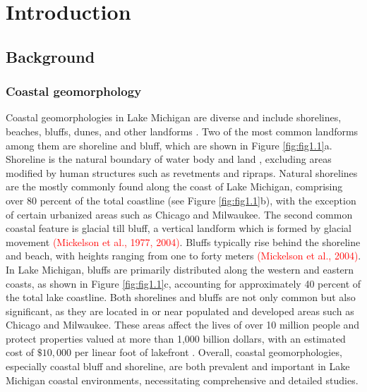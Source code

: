 \chapter{Introduction}
\label{ch:Introduction}

\section{Background}
\label{sec:Background}

\subsection{Coastal geomorphology}
\label{subsec:Coastal geomorphology}

Coastal geomorphologies in Lake Michigan are diverse and include shorelines, beaches, bluffs, dunes, and other landforms \citep{jackson_coastal_2013}. Two of the most common landforms among them are shoreline and bluff, which are shown in Figure \ref{fig:fig1.1}a. Shoreline is the natural boundary of water body and land \citep{del_rio_error_2013}, excluding areas modified by human structures such as revetments and ripraps. Natural shorelines are the mostly commonly found along the coast of Lake Michigan, comprising over 80 percent of the total coastline (see Figure \ref{fig:fig1.1}b), with the exception of certain urbanized areas such as Chicago and Milwaukee. The second common coastal feature is glacial till bluff, a vertical landform which is formed by glacial movement \textcolor{red}{(Mickelson et al., 1977, 2004)}. Bluffs typically rise behind the shoreline and beach, with heights ranging from one to forty meters \textcolor{red}{(Mickelson et al., 2004)}. In Lake Michigan, bluffs are primarily distributed along the western and eastern coasts, as shown in Figure \ref{fig:fig1.1}c, accounting for approximately 40 percent of the total lake coastline. Both shorelines and bluffs are not only common but also significant, as they are located in or near populated and developed areas such as Chicago and Milwaukee. These areas affect the lives of over 10 million people and protect properties valued at more than 1,000 billion dollars, with an estimated cost of $ \$10,000$ per linear foot of lakefront \citep{folger_coastal_1996}. Overall, coastal geomorphologies, especially coastal bluff and shoreline, are both prevalent and important in Lake Michigan coastal environments, necessitating comprehensive and detailed studies.
